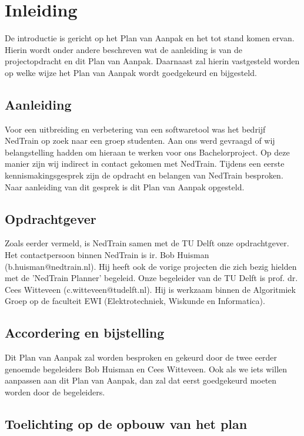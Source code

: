 \section{Inleiding}
De introductie is gericht op het Plan van Aanpak en het tot stand komen ervan. Hierin wordt onder andere beschreven wat de aanleiding is van de projectopdracht en dit Plan van Aanpak. Daarnaast zal hierin vastgesteld worden op welke wijze het Plan van Aanpak wordt goedgekeurd en bijgesteld.\\

\subsection{Aanleiding}
Voor een uitbreiding en verbetering van een softwaretool was het bedrijf NedTrain op zoek naar een groep studenten. Aan ons werd gevraagd of wij belangstelling hadden om hieraan te werken voor ons Bachelorproject. Op deze manier zijn wij indirect in contact gekomen met NedTrain. Tijdens een eerste kennismakingsgesprek zijn de opdracht en belangen van NedTrain besproken. Naar aanleiding van dit gesprek is dit Plan van Aanpak opgesteld.\\

\subsection{Opdrachtgever}
Zoals eerder vermeld, is NedTrain samen met de TU Delft onze opdrachtgever. Het contactpersoon binnen NedTrain is ir. Bob Huisman (b.huisman@nedtrain.nl). Hij heeft ook de vorige projecten die zich bezig hielden met de 'NedTrain Planner' begeleid. Onze begeleider van de TU Delft is prof. dr. Cees Witteveen (c.witteveen@tudelft.nl). Hij is werkzaam binnen de Algoritmiek Groep op de faculteit EWI (Elektrotechniek, Wiskunde en Informatica).\\

\subsection{Accordering en bijstelling}
Dit Plan van Aanpak zal worden besproken en gekeurd door de twee eerder genoemde begeleiders Bob Huisman en Cees Witteveen. Ook als we iets willen aanpassen aan dit Plan van Aanpak, dan zal dat eerst goedgekeurd moeten worden door de begeleiders.\\

\subsection{Toelichting op de opbouw van het plan}
